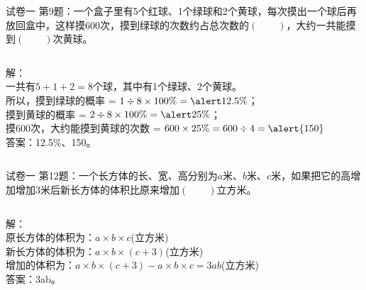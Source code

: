 \documentclass[aspectratio=169]{ctexbeamer} %
\begin{document}
\begin{frame}[t]{试卷一}
第9题：一个盒子里有5个红球、1个绿球和2个黄球，每次摸出一个球后再放回盒中，这样摸600次，摸到绿球的次数约占总次数的$(\qquad)$，大约一共能摸到$(\qquad)$次黄球。
\pause
\begin{columns}
\pause
解：\\
一共有$5 + 1 + 2 = 8$个球，其中有1个绿球、2个黄球。\\
所以，摸到绿球的概率 = $1 \div 8 \times 100\% = \alert{12.5\%}$；\\
\pause
摸到黄球的概率 = $2 \div 8 \times 100\% = \alert{25\%}$；\\
摸600次，大约能摸到黄球的次数  = $600 \times 25\% = 600 \div 4 = \alert{150}$ \\
答案：\alert{12.5\%}、\alert{150}。
\end{columns}
\end{frame}

\begin{frame}[t]{试卷一}
第12题：一个长方体的长、宽、高分别为$a$米、$b$米、$c$米，如果把它的高增加增加3米后新长方体的体积比原来增加$(\qquad)$立方米。
\pause
\begin{columns}
\pause
解：\\
原长方体的体积为：$a \times b \times c$(立方米) \\
新长方体的体积为：$a \times b \times (c+3)$(立方米) \\
增加的体积为：$a \times b \times (c+3) - a \times b \times c = 3ab$(立方米) \\
答案：\alert{3ab}。
\end{columns}
\end{frame}
\end{document}
